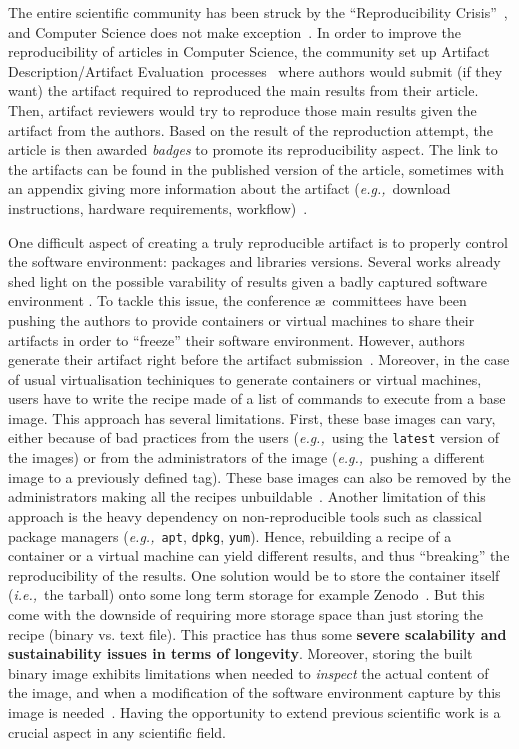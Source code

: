 \documentclass[sigconf,natbib=false]{acmart}
\newcommand{\ie}{\emph{i.e.,}}
\newcommand{\eg}{\emph{e.g.,}}
\newcommand{\ad}{Artifact Description}
\newcommand{\aeval}{Artifact Evaluation}
\newcommand{\adae}{\ad/\aeval}
\begin{document}
The entire scientific community has been struck by the ``Reproducibility Crisis''~\cite{baker500ScientistsLift2016}, and Computer Science does not make exception~\cite{collberg_repeatability_2015}.
In order to improve the reproducibility of articles in Computer Science, the community set up \adae\ processes~\cite{kidwell2016badges} where authors would submit (if they want) the artifact required to reproduced the main results from their article.
Then, artifact reviewers would try to reproduce those main results given the artifact from the authors.
Based on the result of the reproduction attempt, the article is then awarded \emph{badges} to promote its reproducibility aspect.
The link to the artifacts can be found in the published version of the article, sometimes with an appendix giving more information about the artifact (\eg\ download instructions, hardware requirements, workflow)~\cite{paperswithcode, kang2023papers, hong2013software}.

One difficult aspect of creating a truly reproducible artifact is to properly control the software environment: packages and libraries versions.
Several works already shed light on the possible varability of results given a badly captured software environment \cite{mytkowicz_producing_nodate}.
To tackle this issue, the conference \ae\ committees have been pushing the authors to provide containers or virtual machines to share their artifacts in order to ``freeze'' their software environment.
However, authors generate their artifact right before the artifact submission~\cite{guilloteau2024longevity, guilloteau2024frustrations}.
Moreover, in the case of usual virtualisation techiniques to generate containers or virtual machines, users have to write the recipe made of a list of commands to execute from a base image.
This approach has several limitations.
First, these base images can vary, either because of bad practices from the users (\eg\ using the \texttt{latest} version of the images) or from the administrators of the image (\eg\ pushing a different image to a previously defined tag).
These base images can also be removed by the administrators making all the recipes unbuildable~\cite{nvidia_cuda_lifetime}.
Another limitation of this approach is the heavy dependency on non-reproducible tools such as classical package managers (\eg\ \texttt{apt}, \texttt{dpkg}, \texttt{yum}).
Hence, rebuilding a recipe of a container or a virtual machine can yield different results, and thus ``breaking'' the reproducibility of the results.
One solution would be to store the container itself (\ie\ the tarball) onto some long term storage for example Zenodo~\cite{zenodo}.
But this come with the downside of requiring more storage space than just storing the recipe (binary vs. text file).
This practice has thus some \textbf{severe scalability and sustainability issues in terms of longevity}.
Moreover, storing the built binary image exhibits limitations when needed to \emph{inspect} the actual content of the image, and when a modification of the software environment capture by this image is needed~\cite{mercier2018considering}.
Having the opportunity to extend previous scientific work is a crucial aspect in any scientific field.
\end{document}
